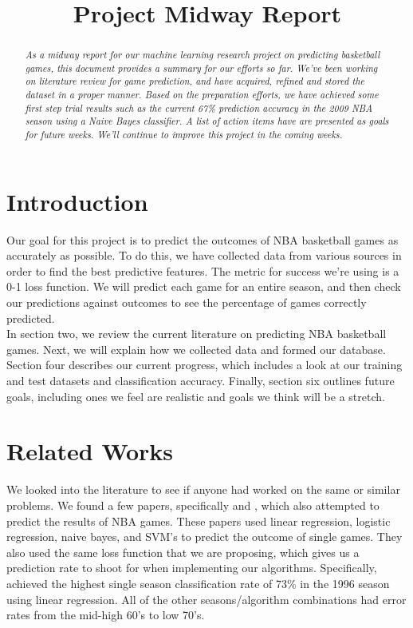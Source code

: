 \documentclass{article}
\title{Project Midway Report}
\begin{document}
\maketitle

	\begin{abstract}
		\em{As a midway report for our machine learning research project on predicting basketball games, this document provides a summary for our efforts so far. We've been working on literature review for game prediction, and have acquired, refined and stored the dataset in a proper manner. Based on the preparation efforts, we have achieved some first step trial results such as the current 67\% prediction accuracy in the 2009 NBA season using a Naive Bayes classifier. A list of action items have are presented as goals for future weeks. We'll continue to improve this project in the coming weeks.}
	\end{abstract}

\section{Introduction}
	Our goal for this project is to predict the outcomes of NBA basketball games as accurately as possible. To do this, we have collected data from various sources in order to find the best predictive features. The metric for success we're using is a 0-1 loss function. We will predict each game for an entire season, and then check our predictions against outcomes to see the percentage of games correctly predicted. \\

	In section two, we review the current literature on predicting NBA basketball games. Next, we will explain how we collected data and formed our database. Section four describes our current progress, which includes a look at our training and test datasets and classification accuracy. Finally, section six outlines future goals, including ones we feel are realistic and goals we think will be a stretch. 

\section{Related Works}
	We looked into the literature to see if anyone had worked on the same or similar problems. We found a few papers, specifically \cite{nba_oracle} and \cite{data_mining}, which also attempted to predict the results of NBA games. These papers used linear regression, logistic regression, naive bayes, and SVM's to predict the outcome of single games. They also used the same loss function that we are proposing, which gives us a prediction rate to shoot for when implementing our algorithms. Specifically, \cite{nba_oracle} achieved the highest single season classification rate of 73\% in the 1996 season using linear regression. All of the other seasons/algorithm combinations had error rates from the mid-high 60's to low 70's. \\
\end{document}
